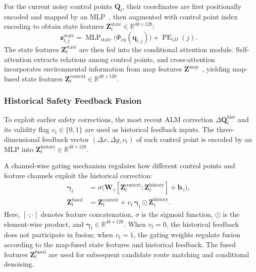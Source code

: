 \documentclass[journal]{IEEEtran}
\begin{document}
For the current noisy control points $\mathbf Q_t$, their coordinates are first
positionally encoded and mapped by an MLP~\cite{fourier}, then augmented with
control point index encoding to obtain state features
$\mathbf Z_t^{\mathrm{state}}\in\mathbb R^{48\times128}$:
\begin{equation}
\mathbf z_{t,j}^{\mathrm{state}}=
\operatorname{MLP}_{\mathrm{state}}\bigl(\Phi_{xy}(\mathbf q_{t,j})\bigr)
+\operatorname{PE}_{1D}(j).
\end{equation}
The state features $\mathbf Z_t^{\mathrm{state}}$ are then fed into the
conditional attention module. Self-attention extracts relations among control
points, and cross-attention incorporates environmental information from map
features $\mathbf Z^{\mathrm{map}}$~\cite{attention}, yielding map-fused state
features $\mathbf Z_t^{\mathrm{context}}\in\mathbb R^{48\times128}$.

\subsubsection{Historical Safety Feedback Fusion}
To exploit earlier safety corrections, the most recent ALM correction
$\Delta\mathbf Q_t^{\mathrm{hist}}$ and its validity flag $v_t\in\{0,1\}$ are used
as historical feedback inputs. The three-dimensional feedback vector
$(\Delta x,\Delta y,v_t)$ of each control point is encoded by an MLP into
$\mathbf Z_t^{\mathrm{history}}\in\mathbb R^{48\times128}$.

A channel-wise gating mechanism regulates how different control points and
feature channels exploit the historical correction:
\begin{equation}
\begin{aligned}
\boldsymbol\gamma_t&=\sigma\bigl(\mathbf W_\gamma[
\mathbf Z_t^{\mathrm{context}};\mathbf Z_t^{\mathrm{history}}]+\mathbf b_\gamma\bigr),\\
\mathbf Z_t^{\mathrm{fused}}&=\mathbf Z_t^{\mathrm{context}}
+v_t\,\boldsymbol\gamma_t\odot\mathbf Z_t^{\mathrm{history}}.
\end{aligned}
\end{equation}
Here, $[\cdot;\cdot]$ denotes feature concatenation, $\sigma$ is the sigmoid
function, $\odot$ is the element-wise product, and
$\boldsymbol\gamma_t\in\mathbb R^{48\times128}$. When $v_t=0$, the historical
feedback does not participate in fusion; when $v_t=1$, the gating weights
regulate fusion according to the map-fused state features and historical
feedback. The fused features $\mathbf Z_t^{\mathrm{fused}}$ are used for
subsequent candidate route matching and conditional denoising.
\end{document}
